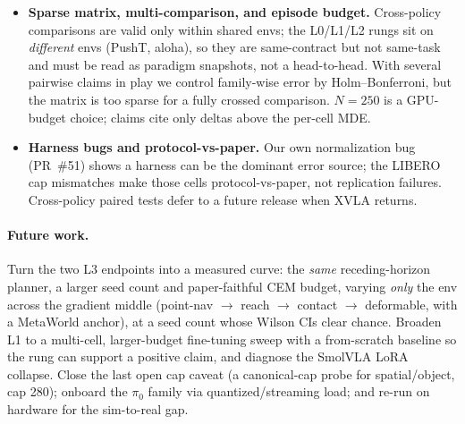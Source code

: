 \documentclass[10pt]{article}
\begin{document}
\begin{itemize}
    The four-suite gap (\S\ref{sec:suite-audit}) is a protocol-level
    discrepancy, not a model claim: our 5~seeds $\times$ 50~episodes
    vs.\ the paper's~\cite{shukor2025smolvla} 10~trials per task
    (initial-state distributions may differ), spatial/object step caps
    unprobed against canonical 600 (one-directional confound: can only
    widen our gap), and $n{=}100$ published self-reports with no per-task
    breakdown, so no task-paired test is possible.
    \item \textbf{Sparse matrix, multi-comparison, and episode budget.}
    Cross-policy comparisons are valid only within shared envs; the
    L0/L1/L2 rungs sit on \emph{different} envs (PushT, aloha), so they are
    same-contract but not same-task and must be read as paradigm snapshots,
    not a head-to-head. With several pairwise claims in play we control
    family-wise error by Holm--Bonferroni, but the matrix is too sparse for
    a fully crossed comparison. $N{=}250$ is a GPU-budget choice; claims
    cite only deltas above the per-cell MDE.
    \item \textbf{Harness bugs and protocol-vs-paper.} Our own
    normalization bug (PR~\#51) shows a harness can be the dominant error
    source; the LIBERO cap mismatches make those cells protocol-vs-paper,
    not replication failures. Cross-policy paired tests defer to a future
    release when XVLA returns.
\end{itemize}

\paragraph{Future work.}
Turn the two L3 endpoints into a measured curve: the \emph{same}
receding-horizon planner, a larger seed count and paper-faithful CEM
budget, varying \emph{only} the env across the gradient middle (point-nav
$\to$ reach $\to$ contact $\to$ deformable, with a MetaWorld anchor), at a
seed count whose Wilson CIs clear chance. Broaden L1 to a multi-cell,
larger-budget fine-tuning sweep with a from-scratch baseline so the rung
can support a positive claim, and diagnose the SmolVLA LoRA collapse.
Close the last open cap caveat (a canonical-cap probe for
spatial/object, cap 280); onboard the $\pi_0$
family via quantized/streaming load; and re-run on hardware for the
sim-to-real gap.
\end{document}
